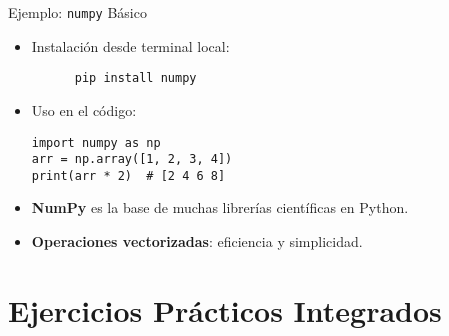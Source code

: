 \documentclass[10pt]{beamer}
\begin{document}
\begin{frame}[fragile]{Ejemplo: \texttt{numpy} Básico}
  \begin{itemize}
    \item Instalación desde terminal local:
    \begin{verbatim}
      pip install numpy
    \end{verbatim}
    \item Uso en el código:
    \begin{verbatim}
import numpy as np
arr = np.array([1, 2, 3, 4])
print(arr * 2)  # [2 4 6 8]
    \end{verbatim}
    \item \textbf{NumPy} es la base de muchas librerías científicas en Python.
    \item \textbf{Operaciones vectorizadas}: eficiencia y simplicidad.
  \end{itemize}
\end{frame}


\section{Ejercicios Prácticos Integrados}
\end{document}
